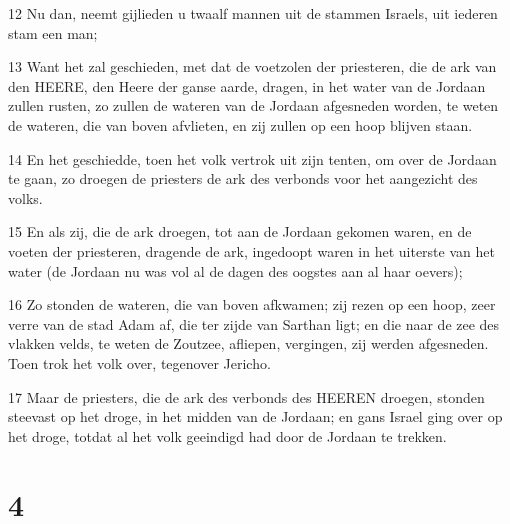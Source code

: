 \par 12 Nu dan, neemt gijlieden u twaalf mannen uit de stammen Israels, uit iederen stam een man;
\par 13 Want het zal geschieden, met dat de voetzolen der priesteren, die de ark van den HEERE, den Heere der ganse aarde, dragen, in het water van de Jordaan zullen rusten, zo zullen de wateren van de Jordaan afgesneden worden, te weten de wateren, die van boven afvlieten, en zij zullen op een hoop blijven staan.
\par 14 En het geschiedde, toen het volk vertrok uit zijn tenten, om over de Jordaan te gaan, zo droegen de priesters de ark des verbonds voor het aangezicht des volks.
\par 15 En als zij, die de ark droegen, tot aan de Jordaan gekomen waren, en de voeten der priesteren, dragende de ark, ingedoopt waren in het uiterste van het water (de Jordaan nu was vol al de dagen des oogstes aan al haar oevers);
\par 16 Zo stonden de wateren, die van boven afkwamen; zij rezen op een hoop, zeer verre van de stad Adam af, die ter zijde van Sarthan ligt; en die naar de zee des vlakken velds, te weten de Zoutzee, afliepen, vergingen, zij werden afgesneden. Toen trok het volk over, tegenover Jericho.
\par 17 Maar de priesters, die de ark des verbonds des HEEREN droegen, stonden steevast op het droge, in het midden van de Jordaan; en gans Israel ging over op het droge, totdat al het volk geeindigd had door de Jordaan te trekken.

\chapter{4}


